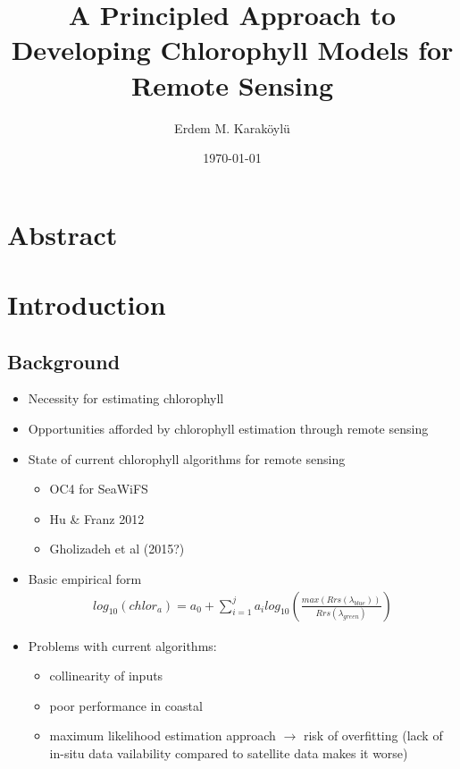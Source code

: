 \documentclass[10pt]{article}
\begin{document}
\author{Erdem M. Karaköylü}
\title{A Principled Approach to Developing Chlorophyll Models for Remote Sensing}
\date{\today}
\maketitle
\tableofcontents
\newpage

\newcommand{\reddash}{\raisebox{2pt}{\tikz{\draw[-,red,dashed,line width=1.2pt](0,0) -- (5mm,0);}}}
\newcommand{\blkdash}{\raisebox{2pt}{\tikz{\draw[-,black,dashed,line width=1.2pt](0,0) -- (5mm,0);}}}
\newcommand{\blksold}{\raisebox{2pt}{\tikz{\draw[-,black,solid,line width=1.2pt](0,0) -- (5mm,0);}}}
\section{Abstract}

\newpage

\section{Introduction}
	\subsection{Background}
		\begin{itemize}
		\item Necessity for estimating chlorophyll
		\item Opportunities afforded by chlorophyll estimation through remote sensing
		\item State of current chlorophyll algorithms for remote sensing
		\begin{itemize}
		    \item OC4 for SeaWiFS
		    \item Hu \& Franz 2012
		    \item Gholizadeh et al (2015?)
		\end{itemize}
		\item Basic empirical form
		\begin{align}
		log_{10}\left(chlor_a\right) = a_0 + \sum_{i=1}^ja_ilog_{10}\left(\frac{max\left(Rrs	\left(\lambda_{blue}\right)\right)}{Rrs\left(\lambda_{green}\right)}\right)
		\end{align}
		\item Problems with current algorithms:
		\begin{itemize}
			\item collinearity of inputs
			\item poor performance in coastal
			\item maximum likelihood estimation approach $\rightarrow$ risk of overfitting (lack of in-situ data vailability  compared to satellite data makes it worse)
		\end{itemize}
	\end{itemize}
	
\end{document}
